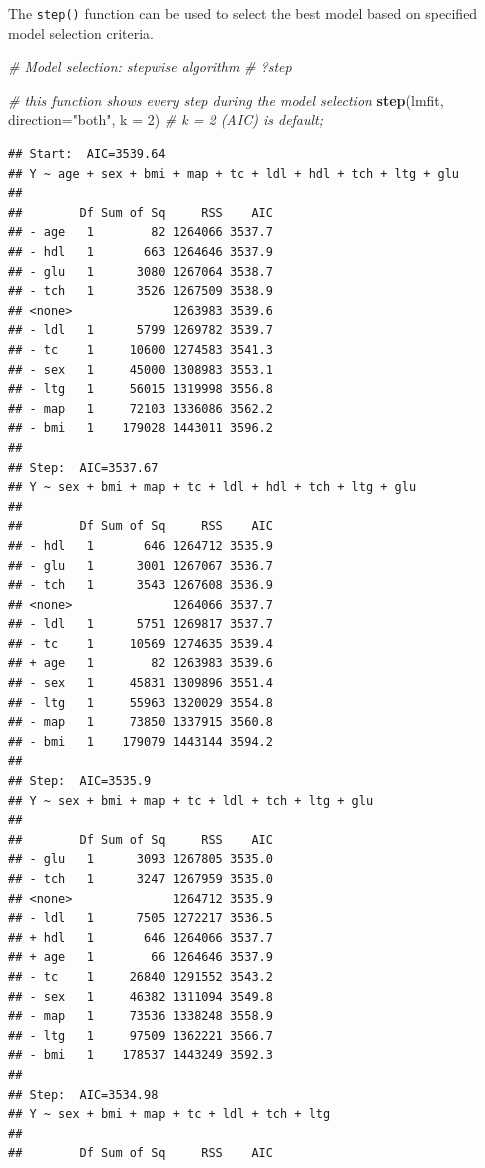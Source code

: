 \documentclass[
]{book}
\newenvironment{Shaded}{\begin{snugshade}}{\end{snugshade}}
\newcommand{\CommentTok}[1]{\textcolor[rgb]{0.56,0.35,0.01}{\textit{#1}}}
\newcommand{\DataTypeTok}[1]{\textcolor[rgb]{0.13,0.29,0.53}{#1}}
\newcommand{\DecValTok}[1]{\textcolor[rgb]{0.00,0.00,0.81}{#1}}
\newcommand{\KeywordTok}[1]{\textcolor[rgb]{0.13,0.29,0.53}{\textbf{#1}}}
\newcommand{\NormalTok}[1]{#1}
\newcommand{\StringTok}[1]{\textcolor[rgb]{0.31,0.60,0.02}{#1}}
\begin{document}
The \texttt{step()} function can be used to select the best model based on specified model selection criteria.

\begin{Shaded}
\begin{Highlighting}[]
    \CommentTok{# Model selection: stepwise algorithm }
    \CommentTok{# ?step}
    
    \CommentTok{# this function shows every step during the model selection }
    \KeywordTok{step}\NormalTok{(lmfit, }\DataTypeTok{direction=}\StringTok{"both"}\NormalTok{, }\DataTypeTok{k =} \DecValTok{2}\NormalTok{)    }\CommentTok{# k = 2 (AIC) is default; }
\end{Highlighting}
\end{Shaded}

\begin{verbatim}
## Start:  AIC=3539.64
## Y ~ age + sex + bmi + map + tc + ldl + hdl + tch + ltg + glu
## 
##        Df Sum of Sq     RSS    AIC
## - age   1        82 1264066 3537.7
## - hdl   1       663 1264646 3537.9
## - glu   1      3080 1267064 3538.7
## - tch   1      3526 1267509 3538.9
## <none>              1263983 3539.6
## - ldl   1      5799 1269782 3539.7
## - tc    1     10600 1274583 3541.3
## - sex   1     45000 1308983 3553.1
## - ltg   1     56015 1319998 3556.8
## - map   1     72103 1336086 3562.2
## - bmi   1    179028 1443011 3596.2
## 
## Step:  AIC=3537.67
## Y ~ sex + bmi + map + tc + ldl + hdl + tch + ltg + glu
## 
##        Df Sum of Sq     RSS    AIC
## - hdl   1       646 1264712 3535.9
## - glu   1      3001 1267067 3536.7
## - tch   1      3543 1267608 3536.9
## <none>              1264066 3537.7
## - ldl   1      5751 1269817 3537.7
## - tc    1     10569 1274635 3539.4
## + age   1        82 1263983 3539.6
## - sex   1     45831 1309896 3551.4
## - ltg   1     55963 1320029 3554.8
## - map   1     73850 1337915 3560.8
## - bmi   1    179079 1443144 3594.2
## 
## Step:  AIC=3535.9
## Y ~ sex + bmi + map + tc + ldl + tch + ltg + glu
## 
##        Df Sum of Sq     RSS    AIC
## - glu   1      3093 1267805 3535.0
## - tch   1      3247 1267959 3535.0
## <none>              1264712 3535.9
## - ldl   1      7505 1272217 3536.5
## + hdl   1       646 1264066 3537.7
## + age   1        66 1264646 3537.9
## - tc    1     26840 1291552 3543.2
## - sex   1     46382 1311094 3549.8
## - map   1     73536 1338248 3558.9
## - ltg   1     97509 1362221 3566.7
## - bmi   1    178537 1443249 3592.3
## 
## Step:  AIC=3534.98
## Y ~ sex + bmi + map + tc + ldl + tch + ltg
## 
##        Df Sum of Sq     RSS    AIC

\end{verbatim}
\end{document}
